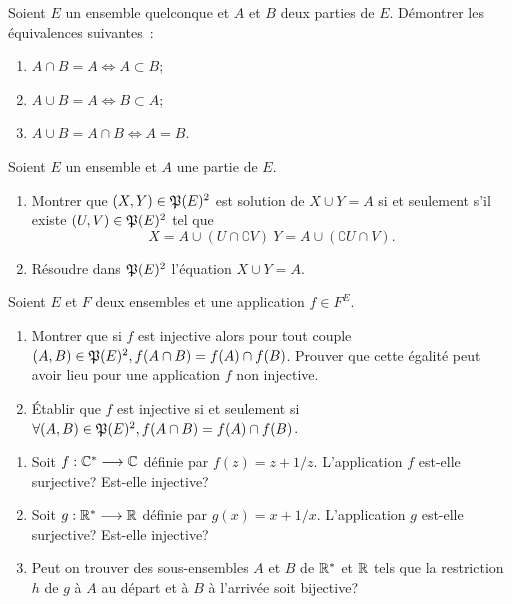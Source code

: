 \begin{exercice}
    Soient \(E\) un ensemble quelconque et \(A\) et \(B\) deux parties de \(E\). 
    Démontrer les équivalences suivantes~:
    \begin{enumerate}
        \item \(A \cap B = A \iff A \subset B \);
        \item \(A \cup B = A \iff B \subset A \);
        \item \(A \cup B = A \cap B \iff A = B \).
    \end{enumerate}
\end{exercice}

\begin{exercice}[Résolution dans \(\Part(E)\) des équations \(X \cup Y = A\) et 
    \(X \cap Y = A\)]
    Soient \(E\) un ensemble et \(A\) une partie de \(E\).
    \begin{enumerate}
        \item Montrer que \((X,Y)\in\mathfrak{P}(E)^2\) est solution de \(X \cup Y = A\) 
            si et seulement s'il existe \((U, V) \in \mathfrak{P}(E)^2\) tel que 
            \[X = A\cup(U\cap \complement V) \ Y = A\cup(\complement U \cap V).\]
        \item Résoudre dans \(\mathfrak{P}(E)^2\) l'équation \(X \cup Y = A\).
    \end{enumerate}
\end{exercice}

\begin{exercice}
    Soient \(E\) et \(F\) deux ensembles et une application \(f \in F^E\).
    \begin{enumerate}
        \item Montrer que si \(f\) est injective alors pour tout couple \((A,B) 
            \in \mathfrak{P}(E)^2, f(A\cap B) = f(A) \cap f(B)\). Prouver que cette 
            égalité peut avoir lieu pour une application \(f\) non injective.
        \item Établir que \(f\) est injective si et seulement si \(\forall (A,B) 
            \in \mathfrak{P}(E)^2, f(A\cap B) = f(A) \cap f(B)\).
    \end{enumerate}
\end{exercice}

\begin{exercice}
    \begin{enumerate}
        \item Soit \(f:\mathbb{C}^* \longrightarrow \mathbb{C}\) définie par \(f(z) = z+1/z\). 
            L'application \(f\) est-elle surjective? Est-elle injective?
        \item Soit \(g:\mathbb{R}^* \longrightarrow \mathbb{R}\) définie par \(g(x) = x+1/x\). 
            L'application \(g\) est-elle surjective? Est-elle injective?
        \item Peut on trouver des sous-ensembles \(A\) et \(B\) de \(\mathbb{R}^*\) et 
            \(\mathbb{R}\) tels que la restriction \(h\) de \(g\) à \(A\) au départ et à 
            \(B\) à l'arrivée soit bijective?
    \end{enumerate}
\end{exercice}


